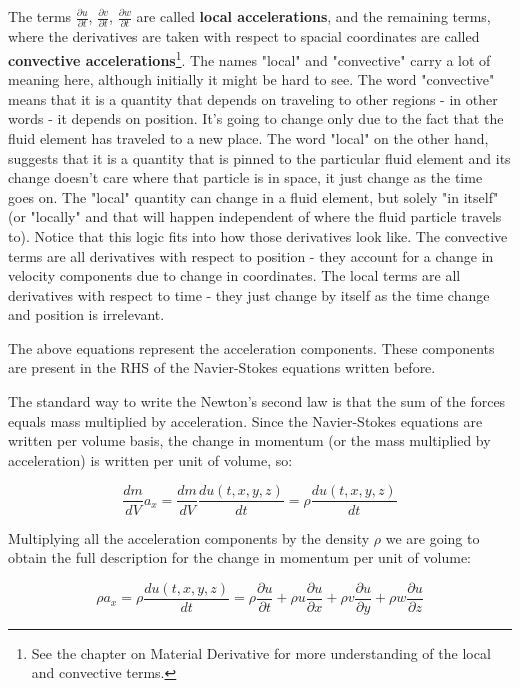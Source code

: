 The terms $\frac{\partial u}{\partial t}$, $\frac{\partial v}{\partial t}$, $\frac{\partial w}{\partial t}$ are called \textbf{local accelerations}, and the remaining terms, where the derivatives are taken with respect to spacial coordinates are called \textbf{convective accelerations}\footnote{See the chapter on Material Derivative for more understanding of the local and convective terms.}. The names "local" and "convective" carry a lot of meaning here, although initially it might be hard to see. The word "convective" means that it is a quantity that depends on traveling to other regions - in other words - it depends on position. It's going to change only due to the fact that the fluid element has traveled to a new place. The word "local" on the other hand, suggests that it is a quantity that is pinned to the particular fluid element and its change doesn't care where that particle is in space, it just change as the time goes on. The "local" quantity can change in a fluid element, but solely "in itself" (or "locally" and that will happen independent of where the fluid particle travels to). Notice that this logic fits into how those derivatives look like. The convective terms are all derivatives with respect to position - they account for a change in velocity components due to change in coordinates. The local terms are all derivatives with respect to time - they just change by itself as the time change and position is irrelevant.

The above equations represent the acceleration components. These components are present in the RHS of the Navier-Stokes equations written before.

The standard way to write the Newton's second law is that the sum of the forces equals mass multiplied by acceleration. Since the Navier-Stokes equations are written per volume basis, the change in momentum (or the mass multiplied by acceleration) is written per unit of volume, so:

\begin{equation}
\frac{dm}{dV} a_x = \frac{dm}{dV} \frac{d u(t,x,y,z)}{dt} = \rho \frac{d u(t,x,y,z)}{dt}
\end{equation}

Multiplying all the acceleration components by the density $\rho$ we are going to obtain the full description for the change in momentum per unit of volume:

\begin{equation}
\rho a_x = \rho \frac{d u(t,x,y,z)}{dt} = \rho \frac{\partial u}{\partial t} + \rho  u \frac{\partial u}{\partial x} + \rho v \frac{\partial u}{\partial y} + \rho w \frac{\partial u}{\partial z}
\end{equation}

